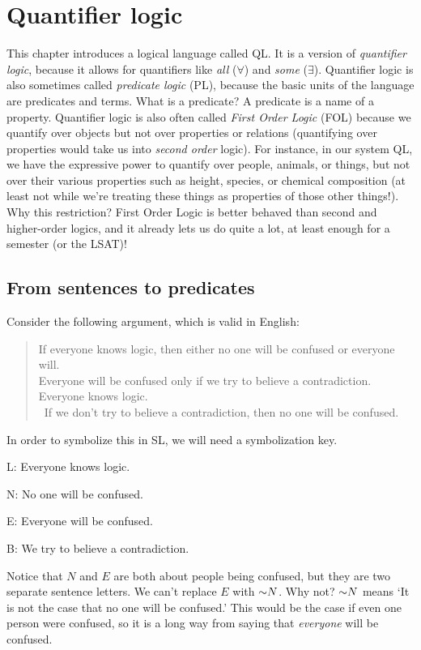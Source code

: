 \chapter{Quantifier logic}
\label{ch.QL}

This chapter introduces a logical language called QL. It is a version of \emph{quantifier logic}, because it allows for quantifiers like \emph{all} ($\forall$) and \emph{some} ($\exists$). Quantifier logic is also sometimes called \emph{predicate logic} (PL), because the basic units of the language are predicates and terms. {\color{black} What is a predicate? A predicate is a name of a property. Quantifier logic is also often called \textit{First Order Logic} (FOL) because we quantify over objects but not over properties or relations (quantifying over properties would take us into \textit{second order} logic). For instance, in our system QL, we have the expressive power to quantify over people, animals, or things, but not over their various properties such as height, species, or chemical composition (at least not while we're treating these things as properties of those other things!). Why this restriction? First Order Logic is better behaved than second and higher-order logics, and it already lets us do quite a lot, at least enough for a semester (or the LSAT)!}

\section{From sentences to predicates}
Consider the following argument, which is valid in English:
\begin{quote}
If everyone knows logic, then either no one will be confused or everyone will. \\ Everyone will be confused only if we try to believe a contradiction. \\ Everyone knows logic.\\
\therefore\ If we don't try to believe a contradiction, then no one will be confused.
\end{quote}
In order to symbolize this in SL, we will need a symbolization key. 
\begin{ekey}
\item[L:] Everyone knows logic.
\item[N:] No one will be confused.
\item[E:] Everyone will be confused.
\item[B:] We try to believe a contradiction.
\end{ekey}
Notice that $N$ and $E$ are both about people being confused, but they are two separate sentence letters. We can't replace $E$ with $\enot N$. Why not? $\enot N$ means `It is not the case that no one will be confused.' This would be the case if even one person were confused, so it is a long way from saying that \emph{everyone} will be confused.


